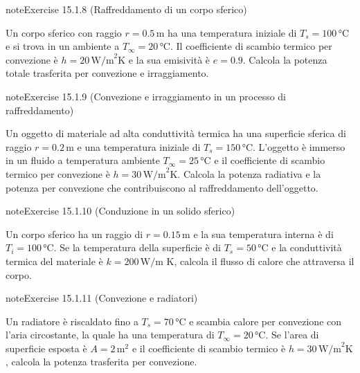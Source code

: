 \documentclass[letterpaper,10pt,italian]{jupyterBook}
\begin{document}
\begin{sphinxadmonition}{note}{Exercise 15.1.8 (Raffreddamento di un corpo sferico)}



\sphinxAtStartPar
Un corpo sferico con raggio \(r = 0.5 \, \text{m}\) ha una temperatura iniziale di \(T_s = 100 \, \text{°C}\) e si trova in un ambiente a \(T_\infty = 20 \, \text{°C}\). Il coefficiente di scambio termico per convezione è \(h = 20 \, \text{W/m}^2\text{K}\) e la sua emisività è \(e = 0.9\). Calcola la potenza totale trasferita per convezione e irraggiamento.
\end{sphinxadmonition}
 \label{exercise:ch/thermodynamics/heat-transmission-problems-exercise-8}

\begin{sphinxadmonition}{note}{Exercise 15.1.9 (Convezione e irraggiamento in un processo di raffreddamento)}



\sphinxAtStartPar
Un oggetto di materiale ad alta conduttività termica ha una superficie sferica di raggio \(r = 0.2 \, \text{m}\) e una temperatura iniziale di \(T_s = 150 \, \text{°C}\). L’oggetto è immerso in un fluido a temperatura ambiente \(T_\infty = 25 \, \text{°C}\) e il coefficiente di scambio termico per convezione è \(h = 30 \, \text{W/m}^2\text{K}\). Calcola la potenza radiativa e la potenza per convezione che contribuiscono al raffreddamento dell’oggetto.
\end{sphinxadmonition}
 \label{exercise:ch/thermodynamics/heat-transmission-problems-exercise-9}

\begin{sphinxadmonition}{note}{Exercise 15.1.10 (Conduzione in un solido sferico)}



\sphinxAtStartPar
Un corpo sferico ha un raggio di \(r = 0.15 \, \text{m}\) e la sua temperatura interna è di \(T_i = 100 \, \text{°C}\). Se la temperatura della superficie è di \(T_s = 50 \, \text{°C}\) e la conduttività termica del materiale è \(k = 200 \, \text{W/m K}\), calcola il flusso di calore che attraversa il corpo.
\end{sphinxadmonition}
 \label{exercise:ch/thermodynamics/heat-transmission-problems-exercise-10}

\begin{sphinxadmonition}{note}{Exercise 15.1.11 (Convezione e radiatori)}



\sphinxAtStartPar
Un radiatore è riscaldato fino a \(T_s = 70 \, \text{°C}\) e scambia calore per convezione con l’aria circostante, la quale ha una temperatura di \(T_\infty = 20 \, \text{°C}\). Se l’area di superficie esposta è \(A = 2 \, \text{m}^2\) e il coefficiente di scambio termico è \(h = 30 \, \text{W/m}^2\text{K}\), calcola la potenza trasferita per convezione.
\end{sphinxadmonition}
 \label{exercise:ch/thermodynamics/heat-transmission-problems-exercise-11}
\end{document}
